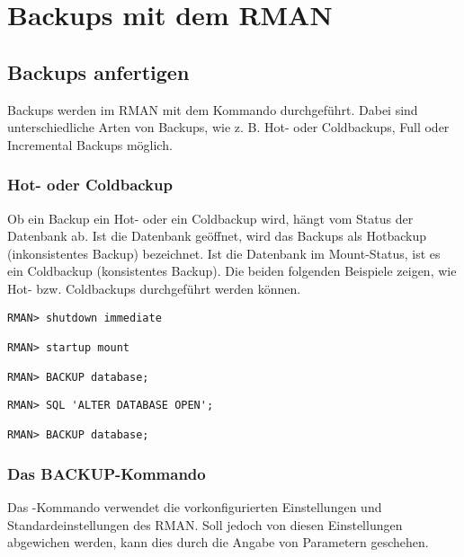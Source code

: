 \chapter{Backups mit dem RMAN}
\chaptertoc{}
\cleardoubleevenpage

    \section{Backups anfertigen}
      Backups werden im RMAN mit dem Kommando 
      durchgeführt. Dabei sind  unterschiedliche Arten von Backups, wie z. B.
      Hot- oder Coldbackups, Full oder Incremental Backups möglich.
      \subsection{Hot- oder Coldbackup}
        Ob ein Backup ein Hot- oder ein Coldbackup wird, hängt vom Status der Datenbank ab. Ist die Datenbank geöffnet, wird das Backups als Hotbackup (inkonsistentes Backup) bezeichnet. Ist die Datenbank im Mount-Status, ist es ein Coldbackup (konsistentes Backup). Die beiden folgenden Beispiele zeigen, wie Hot- bzw. Coldbackups durchgeführt werden können.
        \begin{lstlisting}[caption={Ein Coldbackup durchführen},label=admin1300,language=rman,alsolanguage=sqlplus]
RMAN> shutdown immediate

RMAN> startup mount

RMAN> BACKUP database;
        \end{lstlisting}
        \begin{lstlisting}[caption={Ein Hotbackup durchführen},label=admin1301,language=rman,emph={[9]ALTER,OPEN,DATABASE},emphstyle={[9]\color{magenta}\bfseries}]
RMAN> SQL 'ALTER DATABASE OPEN';

RMAN> BACKUP database;
          \end{lstlisting}
      \subsection{Das BACKUP-Kommando}
        Das -Kommando verwendet die vorkonfigurierten Einstellungen und Standardeinstellungen des RMAN. Soll jedoch von diesen Einstellungen abgewichen werden, kann dies durch die Angabe von Parametern geschehen.
